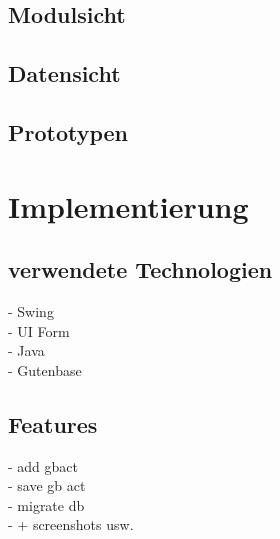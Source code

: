 \subsection{Modulsicht}
\subsection{Datensicht}
\subsection{Prototypen}



\section{Implementierung}
\subsection{verwendete Technologien}
- Swing \\
- UI Form \\
- Java\\
- Gutenbase

\subsection{Features}
- add gbact\\
- save gb act\\
- migrate db \\
- + screenshots usw.


